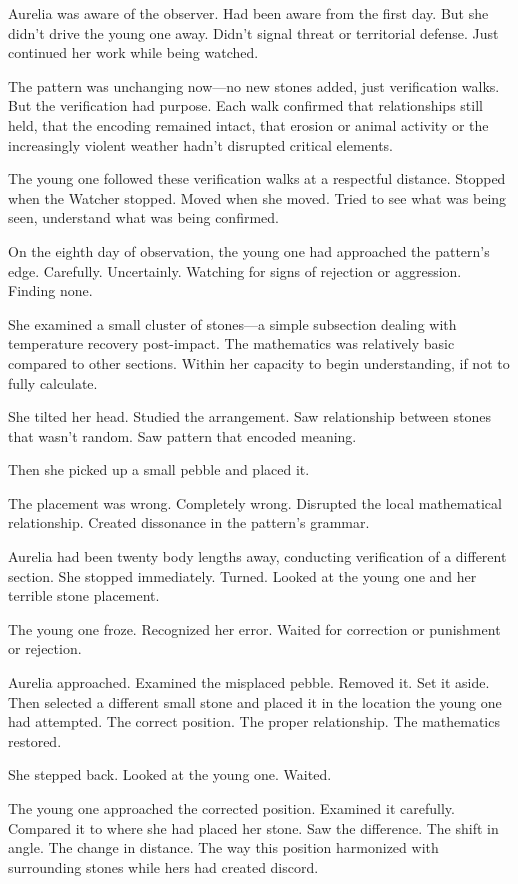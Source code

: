 Aurelia was aware of the observer. Had been aware from the first day. But she didn't drive the young one away. Didn't signal threat or territorial defense. Just continued her work while being watched.

The pattern was unchanging now—no new stones added, just verification walks. But the verification had purpose. Each walk confirmed that relationships still held, that the encoding remained intact, that erosion or animal activity or the increasingly violent weather hadn't disrupted critical elements.

The young one followed these verification walks at a respectful distance. Stopped when the Watcher stopped. Moved when she moved. Tried to see what was being seen, understand what was being confirmed.

On the eighth day of observation, the young one had approached the pattern's edge. Carefully. Uncertainly. Watching for signs of rejection or aggression. Finding none.

She examined a small cluster of stones—a simple subsection dealing with temperature recovery post-impact. The mathematics was relatively basic compared to other sections. Within her capacity to begin understanding, if not to fully calculate.

She tilted her head. Studied the arrangement. Saw relationship between stones that wasn't random. Saw pattern that encoded meaning.

Then she picked up a small pebble and placed it.

The placement was wrong. Completely wrong. Disrupted the local mathematical relationship. Created dissonance in the pattern's grammar.

Aurelia had been twenty body lengths away, conducting verification of a different section. She stopped immediately. Turned. Looked at the young one and her terrible stone placement.

The young one froze. Recognized her error. Waited for correction or punishment or rejection.

Aurelia approached. Examined the misplaced pebble. Removed it. Set it aside. Then selected a different small stone and placed it in the location the young one had attempted. The correct position. The proper relationship. The mathematics restored.

She stepped back. Looked at the young one. Waited.

The young one approached the corrected position. Examined it carefully. Compared it to where she had placed her stone. Saw the difference. The shift in angle. The change in distance. The way this position harmonized with surrounding stones while hers had created discord.


